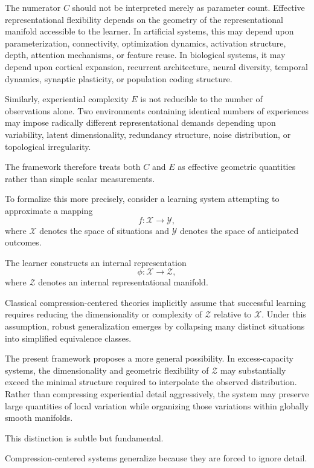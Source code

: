 \documentclass[12pt,a4paper]{article}
\begin{document}
The numerator \(C\) should not be interpreted merely as parameter count. Effective representational flexibility depends on the geometry of the representational manifold accessible to the learner. In artificial systems, this may depend upon parameterization, connectivity, optimization dynamics, activation structure, depth, attention mechanisms, or feature reuse. In biological systems, it may depend upon cortical expansion, recurrent architecture, neural diversity, temporal dynamics, synaptic plasticity, or population coding structure.

Similarly, experiential complexity \(E\) is not reducible to the number of observations alone. Two environments containing identical numbers of experiences may impose radically different representational demands depending upon variability, latent dimensionality, redundancy structure, noise distribution, or topological irregularity.

The framework therefore treats both \(C\) and \(E\) as effective geometric quantities rather than simple scalar measurements.

To formalize this more precisely, consider a learning system attempting to approximate a mapping
\[
f : \mathcal{X} \to \mathcal{Y},
\]
where \(\mathcal{X}\) denotes the space of situations and \(\mathcal{Y}\) denotes the space of anticipated outcomes.

The learner constructs an internal representation
\[
\phi : \mathcal{X} \to \mathcal{Z},
\]
where \(\mathcal{Z}\) denotes an internal representational manifold.

Classical compression-centered theories implicitly assume that successful learning requires reducing the dimensionality or complexity of \(\mathcal{Z}\) relative to \(\mathcal{X}\). Under this assumption, robust generalization emerges by collapsing many distinct situations into simplified equivalence classes.

The present framework proposes a more general possibility. In excess-capacity systems, the dimensionality and geometric flexibility of \(\mathcal{Z}\) may substantially exceed the minimal structure required to interpolate the observed distribution. Rather than compressing experiential detail aggressively, the system may preserve large quantities of local variation while organizing those variations within globally smooth manifolds.

This distinction is subtle but fundamental.

Compression-centered systems generalize because they are forced to ignore detail.
\end{document}
